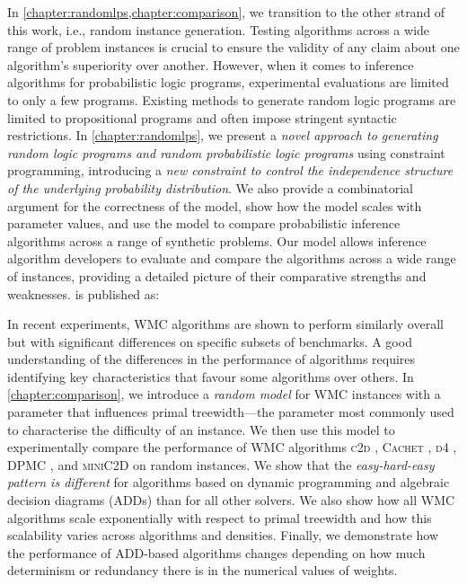 In \cref{chapter:randomlps,chapter:comparison}, we transition to the other strand of this work, i.e., random instance generation. Testing algorithms across a wide range of problem instances is crucial to ensure the validity of any claim about one algorithm's superiority over another. However, when it comes to inference algorithms for probabilistic logic programs, experimental evaluations are limited to only a few programs. Existing methods to generate random logic programs are limited to propositional programs and often impose stringent syntactic restrictions. In \cref{chapter:randomlps}, we present a \emph{novel approach to generating random logic programs and random probabilistic logic programs} using constraint programming, introducing a \emph{new constraint to control the independence structure of the underlying probability distribution}. We also provide a combinatorial argument for the correctness of the model, show how the model scales with parameter values, and use the model to compare probabilistic inference algorithms across a range of synthetic problems. Our model allows inference algorithm developers to evaluate and compare the algorithms across a wide range of instances, providing a detailed picture of their comparative strengths and weaknesses.  is published as:
\begin{displayquote}
\end{displayquote}


In recent experiments, \textsf{WMC} algorithms are shown to perform similarly overall but with significant differences on specific subsets of benchmarks. A good understanding of the differences in the performance of algorithms requires identifying key characteristics that favour some algorithms over others. In \cref{chapter:comparison}, we introduce a \emph{random model} for \textsf{WMC} instances with a parameter that influences primal treewidth---the parameter most commonly used to characterise the difficulty of an instance. We then use this model to experimentally compare the performance of \textsf{WMC} algorithms \textsc{c2d} \citep{DBLP:conf/ecai/Darwiche04}, \textsc{Cachet} \citep{DBLP:conf/sat/SangBBKP04}, \textsc{d4} \citep{DBLP:conf/ijcai/LagniezM17}, \textsc{DPMC} \citep{DBLP:conf/cp/DudekPV20}, and \textsc{miniC2D} \citep{DBLP:conf/ijcai/OztokD15} on random instances. We show that the \emph{easy-hard-easy pattern is different} for algorithms based on dynamic programming and algebraic decision diagrams (ADDs) than for all other solvers. We also show how all \textsf{WMC} algorithms scale exponentially with respect to primal treewidth and how this scalability varies across algorithms and densities. Finally, we demonstrate how the performance of ADD-based algorithms changes depending on how much determinism or redundancy there is in the numerical values of weights.

